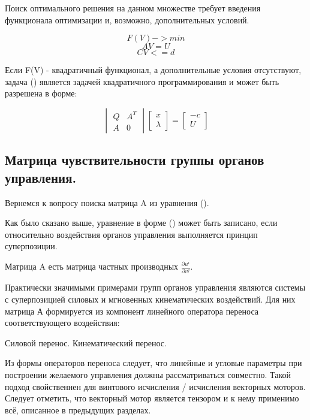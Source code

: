 \documentclass[a4paper]{article}
\begin{document}
Поиск оптимального решения на данном множестве требует введения функционала оптимизации и, возможно, дополнительных условий.

\begin{equation}F(V) -> min\end{equation}
\begin{equation}AV = U\end{equation}
\begin{equation}CV <= d\end{equation}

Если F(V) - квадратичный функционал, а дополнительные условия отсутствуют, задача () является задачей квадратичного программирования и может быть разрешена в форме:

\begin{equation}
\begin{vmatrix}
Q & A^T\\
A & 0
\end{vmatrix}
\begin{bmatrix}
x\\
\lambda
\end{bmatrix}
=
\begin{bmatrix}
-c\\
U
\end{bmatrix}
\end{equation}

\subsection{Матрица чувствительности группы органов управления.}
Вернемся к вопросу поиска матрица A из уравнения ().

Как было сказано выше, уравнение в форме () может быть записано, если относительно воздействия органов управления выполняется принцип суперпозиции. 

Матрица A есть матрица частных производных $\frac{\partial{u^i}}{\partial{v^j}}$.

Практически значимыми примерами групп органов управления являются системы с суперпозицией силовых и мгновенных кинематических воздействий. Для них матрица А формируется из компонент линейного оператора переноса соответствующего воздействия:

Силовой перенос.
Кинематический перенос.

Из формы операторов переноса следует, что линейные и угловые параметры при построении желаемого управления должны рассматриваться совместно. Такой подход свойственнен для винтового исчисления / исчисления векторных моторов. Следует отметить, что векторный мотор является тензором и к нему применимо всё, описанное в предыдущих разделах.  
\end{document}

